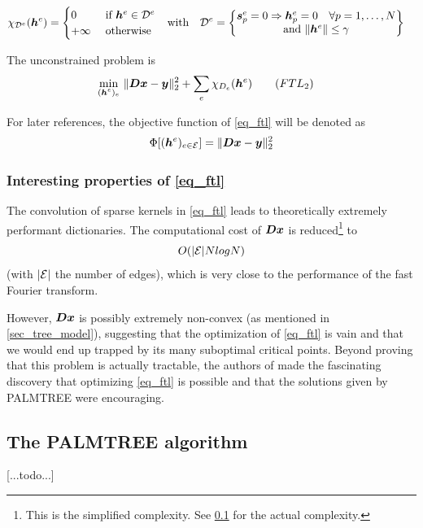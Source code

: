 \begin{align*}
	\chi_{{\mathcal D}^e}(\bm{h}^e) = \begin{cases} 0 &\text{ if } \bm{h}^e \in {\mathcal D}^e \\ +\infty & \ \text{otherwise}\end{cases} & \quad \text{with} \quad {\mathcal D}^e = \begin{Bmatrix} \bm{s}^e_p=0 \Rightarrow \bm{h}^e_p = 0 \quad \forall p=1,\dots,N\\ \text{and }\lVert \bm{h}^e \rVert \le \gamma \end{Bmatrix}
\end{align*}

The unconstrained problem is
\begin{align}
\underset{\substack{(\bm{h}^e)_{e}}}\min ~ & \lVert \bm{D}\bm{x} - \bm{y} \rVert_2^2 + \sum_{e}\chi_{D_e} (\bm{h}^e) \tag{$FTL_2$} \label{eq_ftl2}
\end{align}

For later references, the objective function of \eqref{eq_ftl} will be denoted as
\begin{align}
\Phi[(\bm{h}^e)_{e \in \mathcal E}] = \lVert \bm{D}\bm{x}-\bm{y} \rVert^2_2
\end{align}

\subsubsection{Interesting properties of \eqref{eq_ftl}}

The convolution of sparse kernels in \eqref{eq_ftl} leads to theoretically extremely performant dictionaries. The computational cost of $\bm{D}\bm{x}$ is reduced\footnote{This is the simplified complexity. See \cref{sec_palmtree} for the actual complexity.} to $$O(|\mathcal E| N log N)$$ (with $|\mathcal E|$ the number of edges), which is very close to the performance of the fast Fourier transform.

However, $\bm{D}\bm{x}$ is possibly extremely non-convex (as mentioned in \cref{sec_tree_model}), suggesting that the optimization of \eqref{eq_ftl} is vain and that we would end up trapped by its many suboptimal critical points. Beyond proving that this problem is actually tractable, the authors of \cite{chabiron_optimization_2016} made the fascinating discovery that optimizing \eqref{eq_ftl} is possible and that the solutions given by PALMTREE were encouraging.

\subsection{The PALMTREE algorithm}\label{sec_palmtree}
[...todo...]

